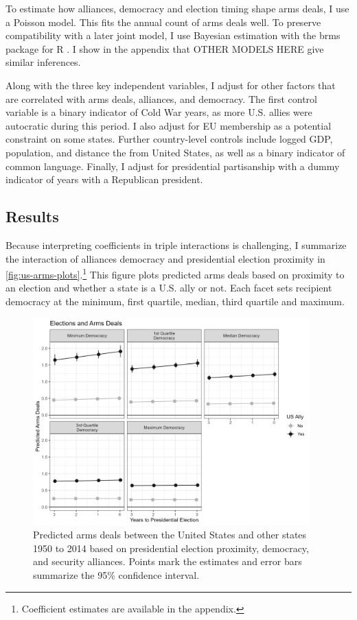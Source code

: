 \documentclass[12pt]{article}
\begin{document}
To estimate how alliances, democracy and election timing shape arms deals, I use a Poisson model.
This fits the annual count of arms deals well.
To preserve compatibility with a later joint model, I use Bayesian estimation with the brms package for \textsf{R} \citep{Buerkner2017}. 
I show in the appendix that OTHER MODELS HERE give similar inferences. 


Along with the three key independent variables, I adjust for other factors that are correlated with arms deals, alliances, and democracy. 
The first control variable is a binary indicator of Cold War years, as more U.S. allies were autocratic during this period. 
I also adjust for EU membership as a potential constraint on some states. 
Further country-level controls include logged GDP, population, and distance the from United States, as well as a binary indicator of common language. 
Finally, I adjust for presidential partisanship with a dummy indicator of years with a Republican president.  



\subsection{Results}


Because interpreting coefficients in triple interactions is challenging, I summarize the interaction of alliances democracy and presidential election proximity in \autoref{fig:us-arms-plots}.\footnote{Coefficient estimates are available in the appendix.}
This figure plots predicted arms deals based on proximity to an election and whether a state is a U.S. ally or not. 
Each facet sets recipient democracy at the minimum, first quartile, median, third quartile and maximum.


\begin{figure}[htpb]
	\centering
		\includegraphics[width=0.95\textwidth]{../figures/us-arms-plots.png}
	\caption{Predicted arms deals between the United States and other states 1950 to 2014 based on presidential election proximity, democracy, and security alliances. Points mark the estimates and error bars summarize the 95\% confidence interval.}
	\label{fig:us-arms-plots}
\end{figure}
\end{document}
